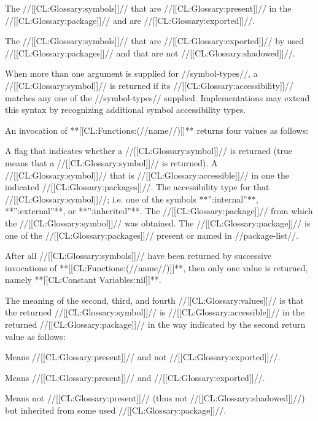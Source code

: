 The //[[CL:Glossary:symbols]]// that are //[[CL:Glossary:present]]// in the //[[CL:Glossary:package]]// and are //[[CL:Glossary:exported]]//.


The //[[CL:Glossary:symbols]]// that are //[[CL:Glossary:exported]]// by used //[[CL:Glossary:packages]]// and that are not //[[CL:Glossary:shadowed]]//. \endlist

When more than one argument is supplied for //symbol-types//, a //[[CL:Glossary:symbol]]// is returned if its //[[CL:Glossary:accessibility]]// matches any one of the //symbol-types// supplied. Implementations may extend this syntax by recognizing additional symbol accessibility types.

An invocation of **[[CL:Functions:(//name//)]]** returns four values as follows:

\beginlist {} A flag that indicates whether a //[[CL:Glossary:symbol]]// is returned (true means that a //[[CL:Glossary:symbol]]// is returned).  A //[[CL:Glossary:symbol]]// that is //[[CL:Glossary:accessible]]// in one the indicated //[[CL:Glossary:packages]]//.  The accessibility type for that //[[CL:Glossary:symbol]]//; i.e. one of the symbols **'':internal''**, **'':external''**, or **'':inherited''**.  The //[[CL:Glossary:package]]// from which the //[[CL:Glossary:symbol]]// was obtained. The //[[CL:Glossary:package]]// is one of the //[[CL:Glossary:packages]]// present or named in //package-list//. \endlist

After all //[[CL:Glossary:symbols]]// have been returned by successive invocations of **[[CL:Functions:(//name//)]]**, then only one value is returned, namely **[[CL:Constant Variables:nil]]**.

The meaning of the second, third, and fourth //[[CL:Glossary:values]]// is that the returned //[[CL:Glossary:symbol]]// is //[[CL:Glossary:accessible]]// in the returned //[[CL:Glossary:package]]// in the way indicated by the second return value as follows:

\beginlist {}

Means //[[CL:Glossary:present]]// and not //[[CL:Glossary:exported]]//.


Means //[[CL:Glossary:present]]// and //[[CL:Glossary:exported]]//.


Means not //[[CL:Glossary:present]]// (thus not //[[CL:Glossary:shadowed]]//) but inherited from some used //[[CL:Glossary:package]]//. \endlist

